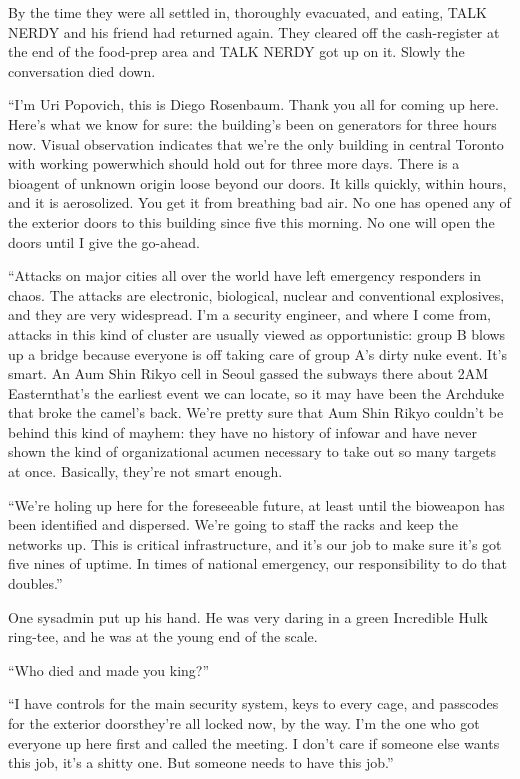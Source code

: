 By the time they were all settled in, thoroughly evacuated, and
eating, TALK NERDY and his friend had returned again. They cleared
off the cash-register at the end of the food-prep area and TALK
NERDY got up on it. Slowly the conversation died down.

“I’m Uri Popovich, this is Diego Rosenbaum. Thank you all for
coming up here. Here’s what we know for sure: the building’s been
on generators for three hours now. Visual observation indicates
that we’re the only building in central Toronto with working
power\dash{}which should hold out for three more days. There is a
bioagent of unknown origin loose beyond our doors. It kills
quickly, within hours, and it is aerosolized. You get it from
breathing bad air. No one has opened any of the exterior doors to
this building since five this morning. No one will open the doors
until I give the go-ahead.

“Attacks on major cities all over the world have left emergency
responders in chaos. The attacks are electronic, biological,
nuclear and conventional explosives, and they are very widespread.
I’m a security engineer, and where I come from, attacks in this
kind of cluster are usually viewed as opportunistic: group B blows
up a bridge because everyone is off taking care of group A’s dirty
nuke event. It’s smart. An Aum Shin Rikyo cell in Seoul gassed the
subways there about 2AM Eastern\dash{}that’s the earliest event we can
locate, so it may have been the Archduke that broke the camel’s
back. We’re pretty sure that Aum Shin Rikyo couldn’t be behind this
kind of mayhem: they have no history of infowar and have never
shown the kind of organizational acumen necessary to take out so
many targets at once. Basically, they’re not smart enough.

“We’re holing up here for the foreseeable future, at least until
the bioweapon has been identified and dispersed. We’re going to
staff the racks and keep the networks up. This is critical
infrastructure, and it’s our job to make sure it’s got five nines
of uptime. In times of national emergency, our responsibility to do
that doubles.”

One sysadmin put up his hand. He was very daring in a green
Incredible Hulk ring-tee, and he was at the young end of the
scale.

“Who died and made you king?”

“I have controls for the main security system, keys to every cage,
and passcodes for the exterior doors\dash{}they’re all locked now, by the
way. I’m the one who got everyone up here first and called the
meeting. I don’t care if someone else wants this job, it’s a shitty
one. But someone needs to have this job.”

